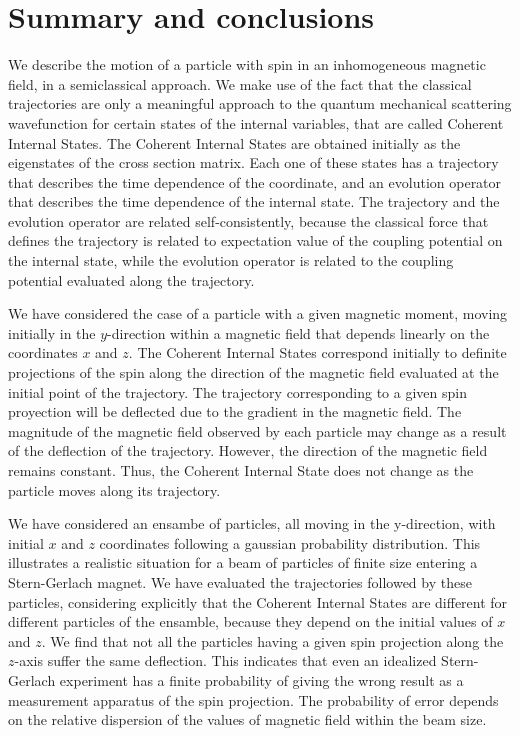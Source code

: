 \documentclass[aps,preprint,prl]{revtex4-2}
\begin{document}
\section{Summary and conclusions}

We describe the motion of a particle with spin in an inhomogeneous magnetic 
field, in a semiclassical approach. We make use of the fact that
the  classical trajectories are only a meaningful approach to the quantum
mechanical scattering wavefunction for certain states of the internal
variables, that are called Coherent Internal States. The Coherent Internal
States are obtained initially as the eigenstates of the cross section matrix. 
Each one of these states has a trajectory that describes the time dependence 
of the
coordinate, and an evolution operator that describes the time dependence 
 of the internal state. The trajectory and the evolution operator are 
related self-consistently, because the classical force that
defines the trajectory is related to expectation value of the coupling
potential on the internal state, while the evolution operator is related 
to the coupling potential evaluated along the trajectory.


We have considered the case of a particle with a given magnetic moment,
moving initially in the $y$-direction within a magnetic field that depends 
linearly on 
the coordinates $x$ and $z$. The Coherent Internal States correspond 
initially to definite projections of the spin along the direction of the 
magnetic field 
evaluated at the initial point of the trajectory. The trajectory corresponding
to a given spin proyection will be deflected due to the gradient in the 
magnetic field. The magnitude of the magnetic field observed by each particle 
may change as a result of the deflection of the trajectory.
However, the direction of
the magnetic field remains constant. Thus, the Coherent Internal State does not
change as the particle moves along its trajectory.

We have considered an ensambe of particles, all moving in the y-direction,
with initial $x$ and $z$ coordinates following a gaussian probability distribution.
This illustrates a realistic situation for a beam of particles of finite size
entering a Stern-Gerlach magnet. We have evaluated the trajectories followed by
these particles, considering explicitly that the Coherent Internal States are
different for different particles of the ensamble, because they depend on
the initial values of $x$ and $z$. We find that not all the particles having a 
given spin projection along the $z$-axis suffer the same deflection. 
This indicates that even
an idealized Stern-Gerlach experiment has a finite probability of giving
the wrong result as a measurement apparatus of the spin projection. The
probability of error depends on the relative dispersion of the values of 
magnetic field within the beam size.
\end{document}
